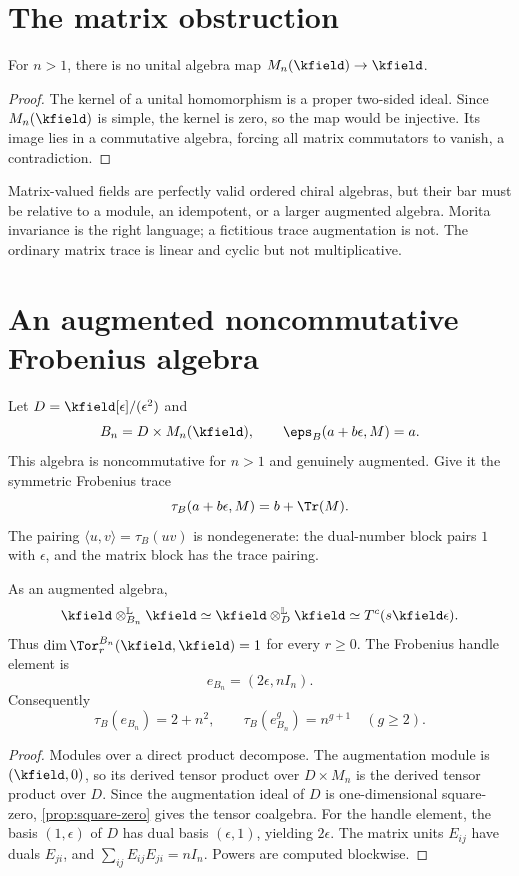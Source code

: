\section{The matrix obstruction}
\begin{theorem}\label{thm:matrix-noaug}
For \(n>1\), there is no unital algebra map \(M_n(\kfield)\to\kfield\).
\end{theorem}
\begin{proof}
The kernel of a unital homomorphism is a proper two-sided ideal.  Since \(M_n(\kfield)\) is simple, the kernel is zero, so the map would be injective.  Its image lies in a commutative algebra, forcing all matrix commutators to vanish, a contradiction.
\end{proof}

Matrix-valued fields are perfectly valid ordered chiral algebras, but their bar must be relative to a module, an idempotent, or a larger augmented algebra.  Morita invariance is the right language; a fictitious trace augmentation is not.  The ordinary matrix trace is linear and cyclic but not multiplicative.

\section{An augmented noncommutative Frobenius algebra}
Let \(D=\kfield[\epsilon]/(\epsilon^2)\) and
\[
 B_n=D\times M_n(\kfield),
 \qquad
 \eps_B(a+b\epsilon,M)=a.
\]
This algebra is noncommutative for \(n>1\) and genuinely augmented.  Give it the symmetric Frobenius trace
\[
 \tau_B(a+b\epsilon,M)=b+\Tr(M).
\]
The pairing \(\langle u,v\rangle=\tau_B(uv)\) is nondegenerate: the dual-number block pairs \(1\) with \(\epsilon\), and the matrix block has the trace pairing.

\begin{proposition}\label{prop:Bn}
As an augmented algebra,
\[
 \kfield\otimes_{B_n}^{\mathbb L}\kfield
 \simeq
 \kfield\otimes_D^{\mathbb L}\kfield
 \simeq T^c(s\kfield\epsilon).
\]
Thus \(\dim\Tor_r^{B_n}(\kfield,\kfield)=1\) for every \(r\ge0\).  The Frobenius handle element is
\[
 e_{B_n}=(2\epsilon,nI_n).
\]
Consequently
\[
 \tau_B(e_{B_n})=2+n^2,
 \qquad
 \tau_B(e_{B_n}^g)=n^{g+1}\quad(g\ge2).
\]
\end{proposition}
\begin{proof}
Modules over a direct product decompose.  The augmentation module is \((\kfield,0)\), so its derived tensor product over \(D\times M_n\) is the derived tensor product over \(D\).  Since the augmentation ideal of \(D\) is one-dimensional square-zero, \cref{prop:square-zero} gives the tensor coalgebra.  For the handle element, the basis \((1,\epsilon)\) of \(D\) has dual basis \((\epsilon,1)\), yielding \(2\epsilon\).  The matrix units \(E_{ij}\) have duals \(E_{ji}\), and \(\sum_{ij}E_{ij}E_{ji}=nI_n\).  Powers are computed blockwise.
\end{proof}

